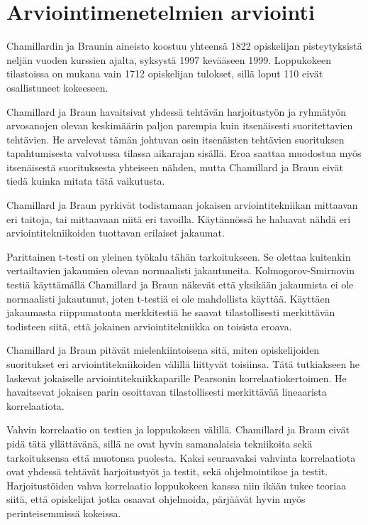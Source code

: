 \documentclass[finnish]{../tktltiki2}
\theoremstyle{definition}
\theoremstyle{remark}
\begin{document}
\section{Arviointimenetelmien arviointi}

Chamillardin ja Braunin aineisto koostuu yhteensä 1822 opiskelijan pisteytyksistä neljän vuoden kurssien ajalta, syksystä 1997 kevääseen 1999. Loppukokeen tilastoissa on mukana vain 1712 opiskelijan tulokset, sillä loput 110 eivät osallistuneet kokeeseen.

Chamillard ja Braun havaitsivat yhdessä tehtävän harjoitustyön ja ryhmä\-työn arvosanojen olevan keskimäärin paljon parempia kuin itsenäisesti suoritettavien tehtävien. He arvelevat tämän johtuvan osin itsenäisten tehtävien suorituksen tapahtumisesta valvotussa tilassa aikarajan sisällä. Eroa saattaa muodostua myös itsenäisestä suorituksesta yhteiseen nähden, mutta Chamillard ja Braun eivät tiedä kuinka mitata tätä vaikutusta.

Chamillard ja Braun pyrkivät todistamaan jokaisen arviointitekniikan mittaavan eri taitoja, tai mittaavaan niitä eri tavoilla. Käytännössä he haluavat nähdä eri arviointitekniikoiden tuottavan erilaiset jakaumat.

Parittainen t-testi on yleinen työkalu tähän tarkoitukseen. Se olettaa kuitenkin vertailtavien jakaumien olevan normaalisti jakautuneita. Kolmogorov-Smirnovin testiä käyttämällä Chamillard ja Braun näkevät että yksikään jakaumista ei ole normaalisti jakautunut, joten t-testiä ei ole mahdollista käyttää. Käyttäen jakaumasta riippumatonta merkkitestiä he saavat tilastollisesti merkittävän todisteen siitä, että jokainen arviointitekniikka on toisista eroava.

Chamillard ja Braun pitävät mielenkiintoisena sitä, miten opiskelijoiden suoritukset eri arviointitekniikoiden välillä liittyvät toisiinsa. Tätä tutkiakseen he laskevat jokaiselle arviointitekniikkaparille Pearsonin korrelaatiokertoimen. He havaitsevat jokaisen parin osoittavan tilastollisesti merkittävää lineaarista korrelaatiota.

Vahvin korrelaatio on testien ja loppukokeen välillä. Chamillard ja Braun eivät pidä tätä yllättävänä, sillä ne ovat hyvin samanalaisia tekniikoita sekä tarkoituksensa että muotonsa puolesta. Kaksi seuraavaksi vahvinta korrelaatiota ovat yhdessä tehtävät harjoitustyöt ja testit, sekä ohjelmointikoe ja testit. Harjoitustöiden vahva korrelaatio loppukokeen kanssa niin ikään tukee teoriaa siitä, että opiskelijat jotka osaavat ohjelmoida, pärjäävät hyvin myös perinteisemmissä kokeissa.
\end{document}
